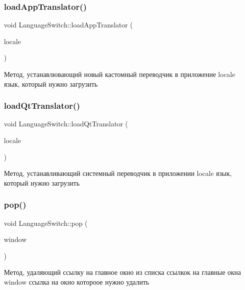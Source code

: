 \subsubsection{\texorpdfstring{loadAppTranslator()}{loadAppTranslator()}}
{\footnotesize\ttfamily void Language\+Switch\+::load\+App\+Translator (\begin{DoxyParamCaption}\item[{Q\+String}]{locale }\end{DoxyParamCaption})}

Метод, устанавлювающий новый кастомный переводчик в приложение locale язык, который нужно загрузить \mbox{\label{class_language_switch_a94b3b12b84af0f4eee8b2b90cbd1cebc}} 
\subsubsection{\texorpdfstring{loadQtTranslator()}{loadQtTranslator()}}
{\footnotesize\ttfamily void Language\+Switch\+::load\+Qt\+Translator (\begin{DoxyParamCaption}\item[{Q\+String}]{locale }\end{DoxyParamCaption})}

Метод, устанавливающий системный переводчик в приложении locale язык, который нужно загрузить \mbox{\label{class_language_switch_ad3507c437b4a165484a385f6afe3882d}} 
\subsubsection{\texorpdfstring{pop()}{pop()}}
{\footnotesize\ttfamily void Language\+Switch\+::pop (\begin{DoxyParamCaption}\item[{\mbox{\hyperlink{class_main_window}{Main\+Window}} $\ast$}]{window }\end{DoxyParamCaption})}

Метод, удаляющий ссылку на главное окно из списка ссылкок на главные окна window ссылка на окно котороое нужно удалить \mbox{\label{class_language_switch_a3ee3f692430ab7bb6337dddc9dfc35cd}} 
